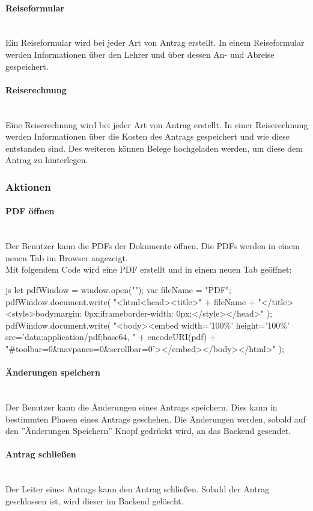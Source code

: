 \paragraph{Reiseformular}~\\
Ein Reiseformular wird bei jeder Art von Antrag erstellt. In einem Reiseformular werden Informationen über den Lehrer und über dessen An- und Abreise gespeichert.
\paragraph{Reiserechnung}~\\
Eine Reiserechnung wird bei jeder Art von Antrag erstellt. In einer Reiserechnung werden Informationen über die Kosten des Antrags gespeichert und wie diese entstanden sind. Des weiteren können Belege hochgeladen werden, um diese dem Antrag zu hinterlegen.
\subsubsection{Aktionen}
\paragraph{PDF öffnen}~\\
Der Benutzer kann die PDFs der Dokumente öffnen. Die PDFs werden in einem neuen Tab im Browser angezeigt.\\
Mit folgendem Code wird eine PDF erstellt und in einem neuen Tab geöffnet:\cite{sof_pdf}
\begin{code}{js}
	let pdfWindow = window.open("");
	var fileName = "PDF";
	pdfWindow.document.write(
	"<html<head><title>" +
	fileName +
	"</title><style>body{margin: 0px;}iframe{border-width: 0px;}</style></head>"
	);
	pdfWindow.document.write(
	"<body><embed width='100\%' height='100\%' src='data:application/pdf;base64, " +
	encodeURI(pdf) +
	"#toolbar=0\&navpanes=0\&scrollbar=0'></embed></body></html>"
	);
\end{code}
\paragraph{Änderungen speichern}~\\
Der Benutzer kann die Änderungen eines Antrags speichern. Dies kann in bestimmten Phasen eines Antrags geschehen. Die Änderungen werden, sobald auf den ''Änderungen Speichern'' Knopf gedrückt wird, an das Backend gesendet.
\paragraph{Antrag schließen}~\\
Der Leiter eines Antrags kann den Antrag schließen. Sobald der Antrag geschlossen ist, wird dieser im Backend gelöscht.
\newpage
